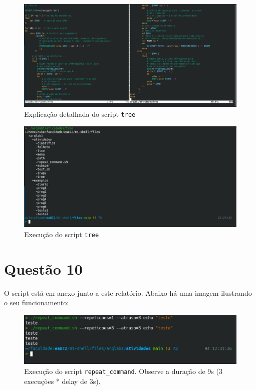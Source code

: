 \documentclass{article}
\begin{document}
\begin{figure}[!ht]
    \begin{center}
        \includegraphics[width=\textwidth]{images/q9.png}
        \caption{Explicação detalhada do script \texttt{tree}}
    \end{center}
\end{figure}

\begin{figure}[!ht]
    \begin{center}
        \includegraphics[width=\textwidth]{images/q9_exec.png}
        \caption{Execução do script \texttt{tree}}
    \end{center}
\end{figure}

\section*{Questão 10}

O script está em anexo junto a este relatório. Abaixo há uma imagem ilustrando o seu funcionamento:

\begin{figure}[!ht]
    \begin{center}
        \includegraphics[width=\textwidth]{images/q10_exec.png}
        \caption{Execução do script \texttt{repeat\_command}. Observe a duração de 9s (3 execuções * delay de 3s).}
    \end{center}
\end{figure}
\end{document}
